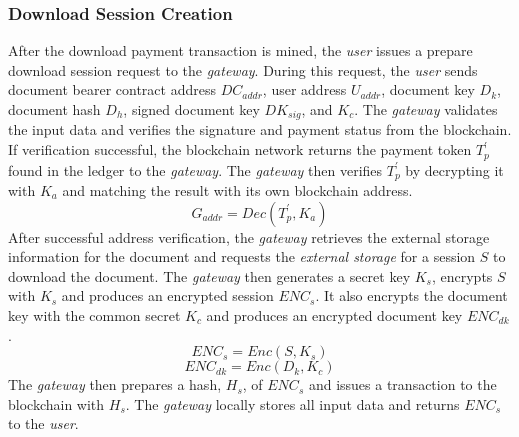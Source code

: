 \subsubsection{Download Session Creation}
After the download payment transaction is mined, the {\it user} issues a prepare download session request to the {\it gateway}. During this request, the {\it user} sends document bearer contract address $DC_{addr}$, user address $U_{addr}$, document key $D_k$, document hash $D_h$, signed document key $DK_{sig}$, and $K_c$. The {\it gateway} validates the input data and verifies the signature and payment status from the blockchain. If verification successful, the blockchain network returns the payment token $T_p^\prime$ found in the ledger to the {\it gateway}. The {\it gateway} then verifies $T_p^\prime$ by decrypting it with $K_a$ and matching the result with its own blockchain address. 
\begin{equation}
\label{eq-d-3}
G_{addr} = Dec (T_p^\prime, K_a)
\end{equation}
After successful address verification, the {\it gateway} retrieves the external storage information for the document and requests the {\it external storage} for a session $S$ to download the document. The {\it gateway} then generates a secret key $K_s$,  encrypts $S$ with $K_s$ and produces an encrypted session $ENC_s$. It also encrypts the document key with the common secret $K_c$ and produces an encrypted document key $ENC_{dk}$. 
\begin{equation}
\label{eq-d-4} 
ENC_s = Enc (S, K_s)
\end{equation}
\begin{equation}
\label{eq-d-5} 
ENC_{dk} = Enc (D_k, K_c)
\end{equation}
The {\it gateway} then prepares a hash, $H_s$, of $ENC_s$ and issues a transaction to the blockchain with $H_s$. The {\it gateway} locally stores all input data and returns $ENC_s$ to the {\it user}.

